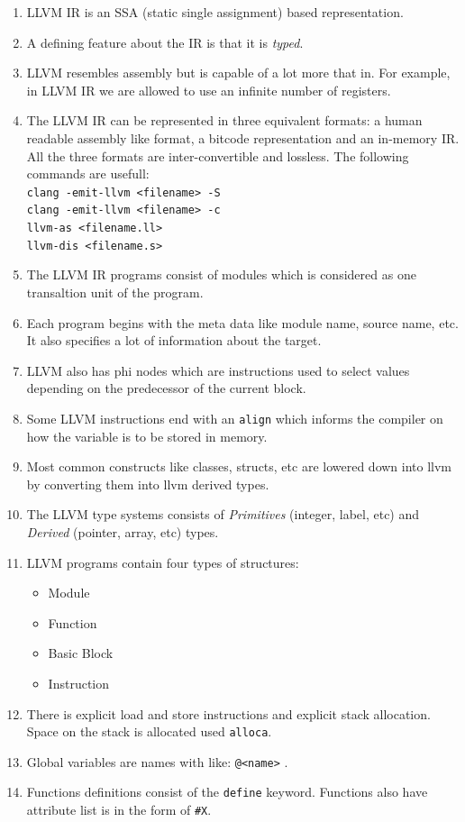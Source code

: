 \documentclass[12pt]{article}
\newcommand{\code}{\texttt}
\begin{document}
\begin{enumerate}
\item LLVM IR is an SSA (static single assignment) based representation.
\item A defining feature about the IR is that it is \textit{typed}.
\item LLVM resembles assembly but is capable of a lot more that in. For example, in LLVM IR we are allowed to use an infinite number of registers.
\item The LLVM IR can be represented in three equivalent formats: a human readable assembly like format, a bitcode representation and an in-memory IR. All the three formats are inter-convertible and lossless. The following commands are usefull:\\
\code{clang -emit-llvm <filename> -S}\\
\code{clang -emit-llvm <filename> -c}\\
\code{llvm-as <filename.ll>}\\
\code{llvm-dis <filename.s>}
\item The LLVM IR programs consist of modules which is considered as one transaltion unit of the program.
\item Each program begins with the meta data like module name, source name, etc. It also specifies a lot of information about the target.
\item LLVM also has phi nodes which are instructions used to select values depending on the predecessor of the current block.
\item Some LLVM instructions end with an \texttt{align} which informs the compiler on how the variable is to be stored in memory.
\item Most common constructs like classes, structs, etc are lowered down into llvm by converting them into llvm derived types.
\item The LLVM type systems consists of \textit{Primitives} (integer, label, etc) and \textit{Derived} (pointer, array, etc) types.
\item LLVM programs contain four types of structures:
\begin{itemize}
\item Module
\item Function
\item Basic Block
\item Instruction
\end{itemize}
\item There is explicit load and store instructions and explicit stack allocation. Space on the stack is allocated used \code{alloca}.
\item Global variables are names with like: \code{@<name>} .
\item Functions definitions consist of the \code{define} keyword. Functions also have attribute list is in the form of \code{\#X}.
\end{enumerate}
\newpage
\end{document}

